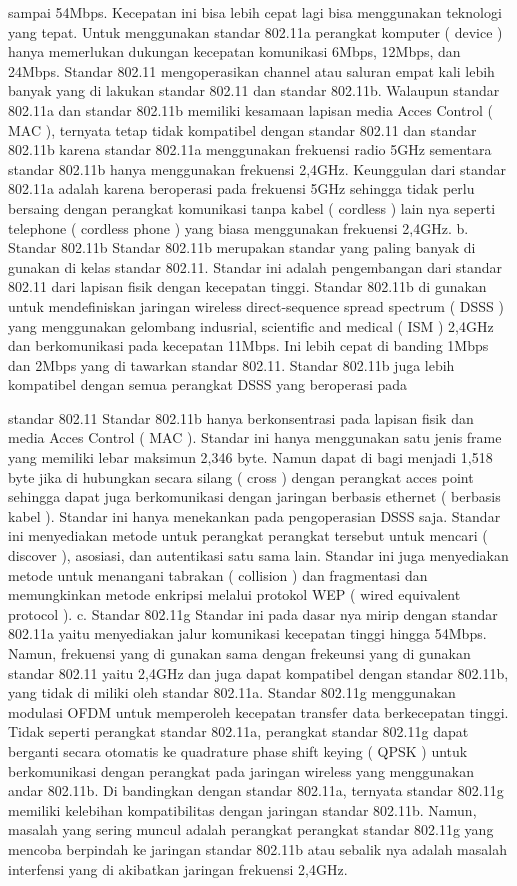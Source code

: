 sampai 54Mbps. Kecepatan ini bisa lebih cepat lagi bisa menggunakan teknologi yang
tepat.
Untuk menggunakan standar 802.11a perangkat komputer ( device ) hanya memerlukan
dukungan kecepatan komunikasi 6Mbps, 12Mbps, dan 24Mbps. Standar 802.11
mengoperasikan channel atau saluran empat kali lebih banyak yang di lakukan standar
802.11 dan standar 802.11b. Walaupun standar 802.11a dan standar 802.11b memiliki
kesamaan lapisan media Acces Control ( MAC ), ternyata tetap tidak kompatibel dengan
standar 802.11 dan standar 802.11b karena standar 802.11a menggunakan frekuensi radio
5GHz sementara standar 802.11b hanya menggunakan frekuensi 2,4GHz.
Keunggulan dari standar 802.11a adalah karena beroperasi pada frekuensi 5GHz sehingga
tidak perlu bersaing dengan perangkat komunikasi tanpa kabel ( cordless ) lain nya seperti
telephone ( cordless phone ) yang biasa menggunakan frekuensi 2,4GHz.
b. Standar 802.11b
Standar 802.11b merupakan standar yang paling banyak di gunakan di kelas standar
802.11. Standar ini adalah pengembangan dari standar 802.11 dari lapisan fisik dengan
kecepatan tinggi. Standar 802.11b di gunakan untuk mendefiniskan jaringan wireless
direct-sequence spread spectrum ( DSSS ) yang menggunakan gelombang indusrial,
scientific and medical ( ISM ) 2,4GHz dan berkomunikasi pada kecepatan 11Mbps. Ini
lebih cepat di banding 1Mbps dan 2Mbps yang di tawarkan standar 802.11. Standar
802.11b juga lebih kompatibel dengan semua perangkat DSSS yang beroperasi pada

standar 802.11
Standar 802.11b hanya berkonsentrasi pada lapisan fisik dan media Acces Control ( MAC
). Standar ini hanya menggunakan satu jenis frame yang memiliki lebar maksimun 2,346
byte. Namun dapat di bagi menjadi 1,518 byte jika di hubungkan secara silang ( cross )
dengan perangkat acces point sehingga dapat juga berkomunikasi dengan jaringan
berbasis ethernet ( berbasis kabel ).
Standar ini hanya menekankan pada pengoperasian DSSS saja. Standar ini menyediakan
metode untuk perangkat perangkat tersebut untuk mencari ( discover ), asosiasi, dan
autentikasi satu sama lain. Standar ini juga menyediakan metode untuk menangani
tabrakan ( collision ) dan fragmentasi dan memungkinkan metode enkripsi melalui
protokol WEP ( wired equivalent protocol ).
c. Standar 802.11g
Standar ini pada dasar nya mirip dengan standar 802.11a yaitu menyediakan jalur
komunikasi kecepatan tinggi hingga 54Mbps. Namun, frekuensi yang di gunakan sama
dengan frekeunsi yang di gunakan standar 802.11 yaitu 2,4GHz dan juga dapat
kompatibel dengan standar 802.11b, yang tidak di miliki oleh standar 802.11a.
Standar 802.11g menggunakan modulasi OFDM untuk memperoleh kecepatan transfer
data berkecepatan tinggi. Tidak seperti perangkat standar 802.11a, perangkat standar
802.11g dapat berganti secara otomatis ke quadrature phase shift keying ( QPSK ) untuk
berkomunikasi dengan perangkat pada jaringan wireless yang menggunakan andar
802.11b.
Di bandingkan dengan standar 802.11a, ternyata standar 802.11g memiliki kelebihan
kompatibilitas dengan jaringan standar 802.11b. Namun, masalah yang sering muncul
adalah perangkat perangkat standar 802.11g yang mencoba berpindah ke jaringan standar
802.11b atau sebalik nya adalah masalah interfensi yang di akibatkan jaringan frekuensi
2,4GHz.

